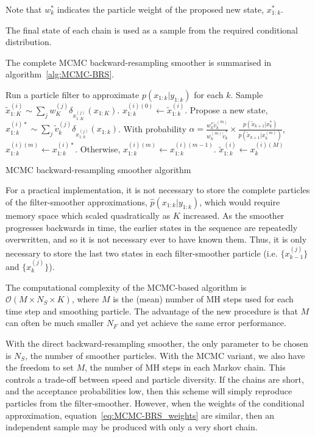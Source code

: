 \documentclass[journal]{IEEEtran}
\begin{document}
Note that $w_k^{*}$ indicates the particle weight of the proposed new state, $x_{1:k}^{*}$.

The final state of each chain is used as a sample from the required conditional distribution.

The complete MCMC backward-resampling smoother is summarised in algorithm~\ref{alg:MCMC-BRS}.

\begin{algorithm}
  \begin{algorithmic}
  	\STATE Run a particle filter to approximate $p(x_{1:k}|y_{1:k})$ for each $k$.
			\STATE Sample $\tilde{x}_{1:K}^{(i)} \sim \sum_j w_K^{(j)} \delta_{x_{1:K}^{(j)}}(x_{1:K})$.
				\STATE $x_{1:k}^{(i)(0)} \gets \tilde{x}_{1:k}^{(i)}$.
					\STATE Propose a new state, $x_{1:k}^{(i)*} \sim \sum_j \tilde{v}_k^{(j)} \delta_{x_{1:k}^{(j)}}(x_{1:k})$.
					\STATE With probability $\alpha = \frac{ w_k^{*} \tilde{v}_k^{(m)} }{  w_k^{(m)} \tilde{v}_k^{*} } \times \frac{ p(\tilde{x}_{k+1}|x_k^{*}) }{ p(\tilde{x}_{k+1}|x_k^{(m)}) }$, $x_{1:k}^{(i)(m)} \gets x_{1:k}^{(i)*}$. Otherwise, $x_{1:k}^{(i)(m)} \gets x_{1:k}^{(i)(m-1)}$.
				\ENDFOR
				\STATE $\tilde{x}_{1:k}^{(i)} \gets x_{k}^{(i)(M)}$
			\ENDFOR
		\ENDFOR
  \end{algorithmic}
  \caption{MCMC backward-resampling smoother algorithm}
  \label{alg:MCMC-BRS}
\end{algorithm}

For a practical implementation, it is not necessary to store the complete particles of the filter-smoother approximations, $\hat{p}(x_{1:k}|y_{1:k})$, which would require memory space which scaled quadratically as $K$ increased. As the smoother progresses backwards in time, the earlier states in the sequence are repeatedly overwritten, and so it is not necessary ever to have known them. Thus, it is only necessary to store the last two states in each filter-smoother particle (i.e. $\{x_{k-1}^{(j)}\}$ and $\{x_{k}^{(j)}\}$).

The computational complexity of the MCMC-based algorithm is $\mathcal{O}(M \times N_S \times K)$, where $M$ is the (mean) number of MH steps used for each time step and smoothing particle. The advantage of the new procedure is that $M$ can often be much smaller $N_F$ and yet achieve the same error performance.

With the direct backward-resampling smoother, the only parameter to be chosen is $N_S$, the number of smoother particles. With the MCMC variant, we also have the freedom to set $M$, the number of MH steps in each Markov chain. This controls a trade-off between speed and particle diversity. If the chains are short, and the acceptance probabilities low, then this scheme will simply reproduce particles from the filter-smoother. However, when the weights of the conditional approximation, equation~\ref{eq:MCMC-BRS_weights} are similar, then an independent sample may be produced with only a very short chain.
\end{document}
